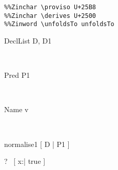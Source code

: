 \begin{verbatim}
%%Zinchar \proviso U+25B8
%%Zinchar \derives U+2500
%%Zinword \unfoldsTo unfoldsTo
\end{verbatim}
\newcommand{\unfoldsTo}{\mathrel{\leadsto}}

\begin{zedjoker}{DeclList} D, D1\end{zedjoker} \\
\begin{zedjoker}{Pred} P1\end{zedjoker} \\
\begin{zedjoker}{Name} v\end{zedjoker} \\

\begin{zedrule}{normalise1}
  [ D | P1 ]
\end{zedrule}

\begin{zed}
  \vdash?~ [ x:\nat | true ]
\end{zed}
